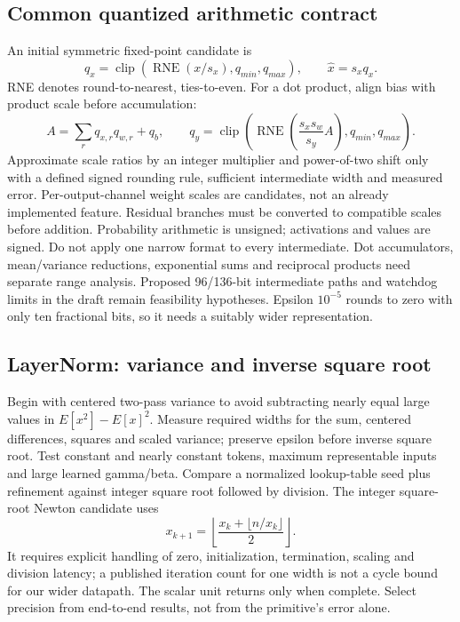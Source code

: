 \subsection{Common quantized arithmetic contract}
An initial symmetric fixed-point candidate is
\[
q_x=\operatorname{clip}\left(\operatorname{RNE}(x/s_x),q_{min},q_{max}\right),\qquad \hat x=s_xq_x.
\]
RNE denotes round-to-nearest, ties-to-even. For a dot product, align bias with product scale before accumulation:
\[
A=\sum_r q_{x,r}q_{w,r}+q_b,\qquad
q_y=\operatorname{clip}\left(\operatorname{RNE}\left(\frac{s_xs_w}{s_y}A\right),q_{min},q_{max}\right).
\]
Approximate scale ratios by an integer multiplier and power-of-two shift only with a defined signed rounding rule, sufficient intermediate width and measured error. Per-output-channel weight scales are candidates, not an already implemented feature. Residual branches must be converted to compatible scales before addition. Probability arithmetic is unsigned; activations and values are signed.
Do not apply one narrow format to every intermediate. Dot accumulators, mean/variance reductions, exponential sums and reciprocal products need separate range analysis. Proposed 96/136-bit intermediate paths and watchdog limits in the draft remain feasibility hypotheses. Epsilon $10^{-5}$ rounds to zero with only ten fractional bits, so it needs a suitably wider representation.

\subsection{LayerNorm: variance and inverse square root}
Begin with centered two-pass variance to avoid subtracting nearly equal large values in $E[x^2]-E[x]^2$. Measure required widths for the sum, centered differences, squares and scaled variance; preserve epsilon before inverse square root. Test constant and nearly constant tokens, maximum representable inputs and large learned gamma/beta.
Compare a normalized lookup-table seed plus refinement against integer square root followed by division. The integer square-root Newton candidate uses
\[
x_{k+1}=\left\lfloor\frac{x_k+\lfloor n/x_k\rfloor}{2}\right\rfloor.
\]
It requires explicit handling of zero, initialization, termination, scaling and division latency; a published iteration count for one width is not a cycle bound for our wider datapath. The scalar unit returns only when complete. Select precision from end-to-end results, not from the primitive's error alone.

